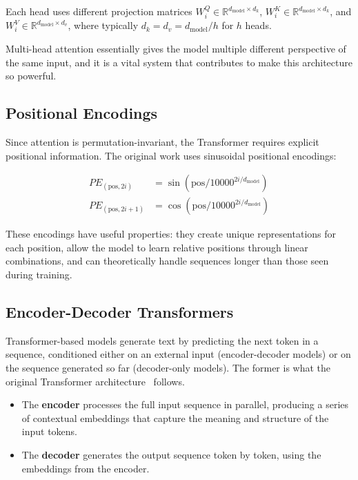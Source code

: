 Each head uses different projection matrices $W_i^Q \in \mathbb{R}^{d_{\text{model}} \times d_k}$, $W_i^K \in \mathbb{R}^{d_{\text{model}} \times d_k}$, and $W_i^V \in \mathbb{R}^{d_{\text{model}} \times d_v}$, where typically $d_k = d_v = d_{\text{model}}/h$ for $h$ heads. 

Multi-head attention essentially gives the model multiple different perspective of the same input, and it is a vital system that contributes to make this architecture so powerful.

\subsection{Positional Encodings}

Since attention is permutation-invariant, the Transformer requires explicit positional information. The original work uses sinusoidal positional encodings:

\begin{align}
PE_{(\text{pos}, 2i)} &= \sin(\text{pos}/10000^{2i/d_{\text{model}}}) \\
PE_{(\text{pos}, 2i+1)} &= \cos(\text{pos}/10000^{2i/d_{\text{model}}})
\end{align}

These encodings have useful properties: they create unique representations for each position, allow the model to learn relative positions through linear combinations, and can theoretically handle sequences longer than those seen during training.

\subsection{Encoder-Decoder Transformers}

Transformer-based models generate text by predicting the next token in a sequence, conditioned either on an external input (encoder-decoder models) or on the sequence generated so far (decoder-only models). The former is what the original Transformer architecture~\cite{attention_is_all_you_need} follows.

\begin{itemize}
  \item The \textbf{encoder} processes the full input sequence in parallel, producing a series of contextual embeddings that capture the meaning and structure of the input tokens.
  \item The \textbf{decoder} generates the output sequence token by token, using the embeddings from the encoder.
\end{itemize}

